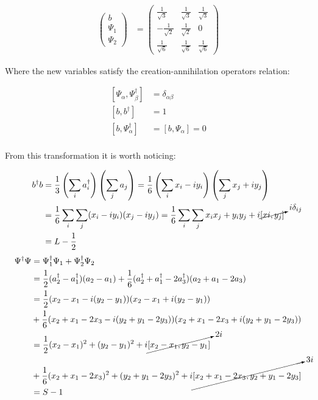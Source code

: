 \begin{align*}
\begin{pmatrix} b \\ \Psi_1 \\ \Psi_2 \end{pmatrix} &= 
\begin{pmatrix}\frac{1}{\sqrt{3}} &\frac{1}{\sqrt{3}}&\frac{1}{\sqrt{3}}\\
				-\frac{1}{\sqrt{2}}&\frac{1}{\sqrt{2}}&0\\
				\frac{1}{\sqrt{6}}&\frac{1}{\sqrt{6}}&\frac{1}{\sqrt{6}}\end{pmatrix}
\end{align*}

Where the new variables satisfy the creation-annihilation operators relation:

\begin{align*}
\left[ \Psi_\alpha,\Psi_\beta^\dagger\right] &= \delta_{\alpha\beta}\\
\left[ b,b^\dagger\right] &= 1\\
\left[ b,\Psi_\alpha^\dagger\right] &=\left[ b,\Psi_\alpha\right] = 0\\
\end{align*}

From this transformation it is worth noticing:

\begin{align*}
b^\dagger b &= \frac{1}{3}\left( \sum_i a_i^\dagger \right)\left( \sum_j a_j \right) =  \frac{1}{6}\left( \sum_i x_i-iy_i \right)\left( \sum_j x_j+iy_j \right)\\
&= \frac{1}{6}\sum_i\sum_j(x_i-iy_i)(x_j-iy_j) = \frac{1}{6}\sum_i\sum_jx_ix_j+y_iy_j +i\cancelto{i\delta_{ij}}{[xi,y_j]}\\
&= L - \frac{1}{2}\\
\end{align*}
\small
\begin{align*}
\Psi^\dagger\Psi &= \Psi_1^\dagger\Psi_1 +\Psi_2^\dagger\Psi_2\\
&= \frac{1}{2} (a_2^\dagger-a_1^\dagger)(a_2-a_1) + \frac{1}{6}(a_2^\dagger+a_1^\dagger-2a_3^\dagger)(a_2+a_1-2a_3)\\
&= \frac{1}{2} (x_2-x_1 -i(y_2-y_1))(x_2-x_1 +i(y_2-y_1))\\
&+\frac{1}{6}(x_2+x_1-2x_3-i(y_2+y_1-2y_3))(x_2+x_1-2x_3 +i(y_2+y_1-2y_3))\\
&= \frac{1}{2} (x_2-x_1)^2+(y_2-y_1)^2+i\cancelto{2i}{[x_2-x_1,y_2-y_1]} \\
&+ \frac{1}{6} (x_2+x_1-2x_3)^2+(y_2+y_1-2y_3)^2+i\cancelto{3i}{[x_2+x_1-2x_3,y_2+y_1-2y_3]}\\
&= S-1
\end{align*}
\normalsize

